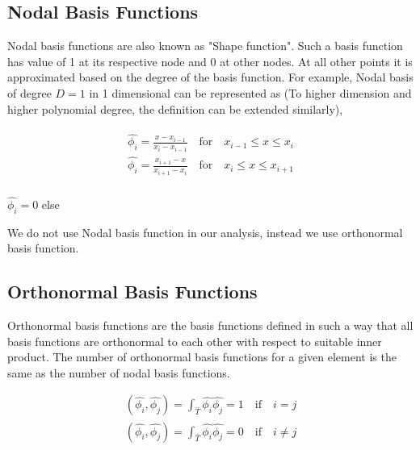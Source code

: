 \documentclass[a4paper,12pt]{book}
\begin{document}
\subsection{Nodal Basis Functions}

Nodal basis functions are also known as "Shape function". Such a basis function has value of 1 at its respective node and 0 at other nodes. At all other points it is approximated based on the degree of the basis function. 
For example, Nodal basis of degree $D=1$ in 1 dimensional can be represented as (To higher dimension and higher polynomial degree, the definition can be extended similarly),

\begin{equation}
\begin{aligned}
\begin{split}
\hat{\phi_i} = \frac{x-x_{i-1}}{x_i-x_{i-1}} \quad \textrm{for} \quad x_{i-1} \leq x \leq x_i\\
\hat{\phi_i} = \frac{x_{i+1}-x}{x_{i+1}-x_{i}} \quad \textrm{for} \quad x_{i} \leq x \leq x_{i+1}\\
\end{split}
\end{aligned}
\end{equation}
\begin{center}
$\hat{\phi_i} = 0$ else
\end{center}

We do not use Nodal basis function in our analysis, instead we use orthonormal basis function.

\subsection{Orthonormal Basis Functions}

Orthonormal basis functions are the basis functions defined in such a way that all basis functions are orthonormal to each other with respect to suitable inner product. The number of orthonormal basis functions for a given element is the same as the number of nodal basis functions. 

\begin{equation}
\begin{split}
(\hat{\phi_i } , \hat{\phi_j}) = \int_{\hat{T}} \hat{\phi_i} \hat{\phi_j} = 1 \quad \textrm{if} \quad i = j \\
(\hat{\phi_i } , \hat{\phi_j}) = \int_{\hat{T}} \hat{\phi_i} \hat{\phi_j} = 0 \quad \textrm{if} \quad i \neq j 
\end{split}
\end{equation}
\end{document}
